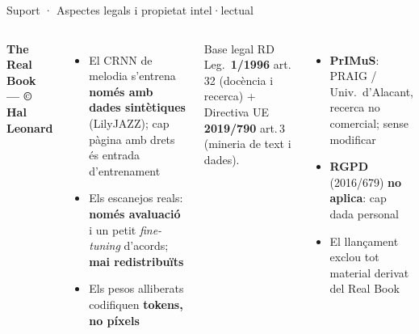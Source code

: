\documentclass[aspectratio=169,10pt]{beamer}
\begin{document}
\begin{frame}{Suport · Aspectes legals i propietat intel·lectual}
  \begin{columns}[T]
    \textbf{\color{accent}The Real Book — © Hal Leonard}
    {\small
    \begin{itemize}\setlength\itemsep{0.3em}
      \item El CRNN de melodia s'entrena \textbf{només amb dades sintètiques} (LilyJAZZ); cap pàgina amb drets és entrada d'entrenament
      \item Els escanejos reals: \textbf{només avaluació} i un petit \textit{fine-tuning} d'acords; \textbf{mai redistribuïts}
      \item Els pesos alliberats codifiquen \textbf{tokens, no píxels}
    \end{itemize}}

    \begin{block}{Base legal}
      {\small RD Leg.\ \textbf{1/1996} art.\,32 (docència i recerca) + Directiva UE \textbf{2019/790} art.\,3 (mineria de text i dades).}
    \end{block}
    {\small
    \begin{itemize}\setlength\itemsep{0.3em}
      \item \textbf{PrIMuS}: PRAIG / Univ.\ d'Alacant, recerca no comercial; sense modificar
      \item \textbf{RGPD} (2016/679) \textbf{no aplica}: cap dada personal
      \item El llançament exclou tot material derivat del Real Book
    \end{itemize}}
  \end{columns}
\end{frame}
\end{document}
